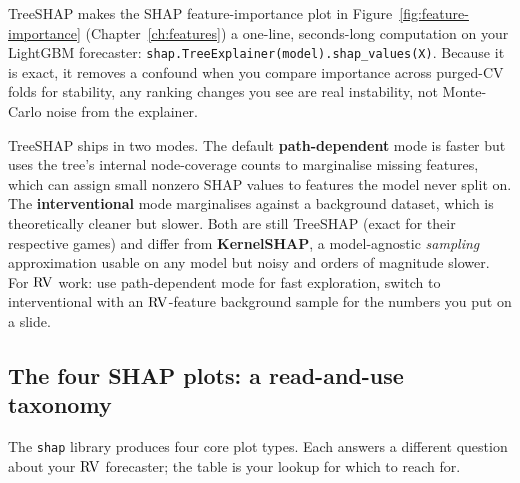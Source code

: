 \begin{projectconnection}
TreeSHAP makes the SHAP feature-importance plot in
Figure~\ref{fig:feature-importance} (Chapter~\ref{ch:features}) a one-line,
seconds-long computation on your LightGBM forecaster:
\texttt{shap.TreeExplainer(model).shap\_values(X)}.  Because it is exact, it
removes a confound when you compare importance across purged-CV folds for
stability, any ranking changes you see are real instability, not Monte-Carlo
noise from the explainer.
\end{projectconnection}

\begin{warning}
TreeSHAP ships in two modes.  The default \textbf{path-dependent} mode is
faster but uses the tree's internal node-coverage counts to marginalise
missing features, which can assign small nonzero SHAP values to features the
model never split on.  The \textbf{interventional} mode marginalises against
a background dataset, which is theoretically cleaner but slower.  Both are
still TreeSHAP (exact for their respective games) and differ from
\textbf{KernelSHAP}, a model-agnostic \emph{sampling} approximation usable on
any model but noisy and orders of magnitude slower.  For $\operatorname{RV}$ work: use
path-dependent mode for fast exploration, switch to interventional with an
$\operatorname{RV}$-feature background sample for the numbers you put on a slide.
\end{warning}

\subsection{The four SHAP plots: a read-and-use taxonomy}

The \texttt{shap} library produces four core plot types.  Each answers a
different question about your $\operatorname{RV}$ forecaster; the table is your
lookup for which to reach for.

